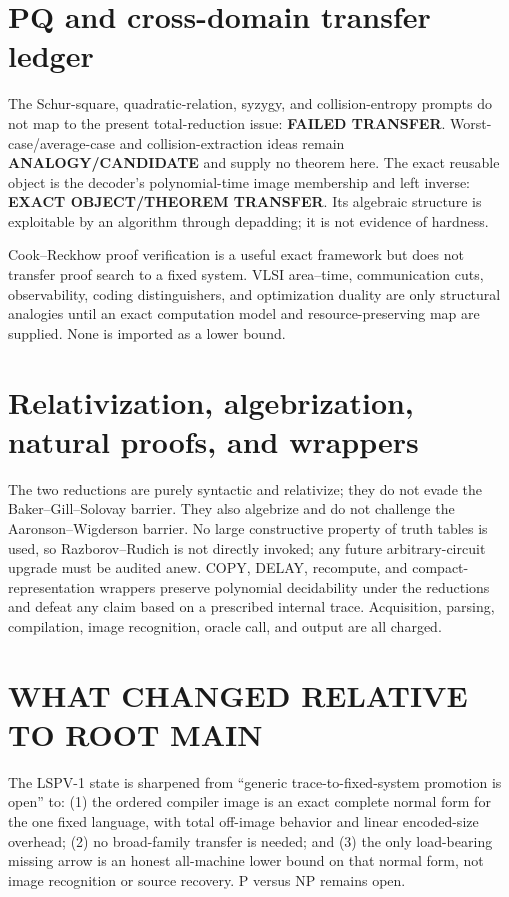 \documentclass[11pt]{article}
\newcommand{\status}[1]{\textbf{#1}}
\begin{document}
\section*{PQ and cross-domain transfer ledger}
The Schur-square, quadratic-relation, syzygy, and collision-entropy prompts do not map to the present total-reduction issue: \status{FAILED TRANSFER}.  Worst-case/average-case and collision-extraction ideas remain \status{ANALOGY/CANDIDATE} and supply no theorem here.  The exact reusable object is the decoder's polynomial-time image membership and left inverse: \status{EXACT OBJECT/THEOREM TRANSFER}.  Its algebraic structure is exploitable by an algorithm through depadding; it is not evidence of hardness.

Cook--Reckhow proof verification is a useful exact framework but does not transfer proof search to a fixed system.  VLSI area--time, communication cuts, observability, coding distinguishers, and optimization duality are only structural analogies until an exact computation model and resource-preserving map are supplied.  None is imported as a lower bound.

\section*{Relativization, algebrization, natural proofs, and wrappers}
The two reductions are purely syntactic and relativize; they do not evade the Baker--Gill--Solovay barrier.  They also algebrize and do not challenge the Aaronson--Wigderson barrier.  No large constructive property of truth tables is used, so Razborov--Rudich is not directly invoked; any future arbitrary-circuit upgrade must be audited anew.  COPY, DELAY, recompute, and compact-representation wrappers preserve polynomial decidability under the reductions and defeat any claim based on a prescribed internal trace.  Acquisition, parsing, compilation, image recognition, oracle call, and output are all charged.

\section*{WHAT CHANGED RELATIVE TO ROOT MAIN}
The LSPV-1 state is sharpened from “generic trace-to-fixed-system promotion is open” to: (1) the ordered compiler image is an exact complete normal form for the one fixed language, with total off-image behavior and linear encoded-size overhead; (2) no broad-family transfer is needed; and (3) the only load-bearing missing arrow is an honest all-machine lower bound on that normal form, not image recognition or source recovery.  P versus NP remains open.
\end{document}
